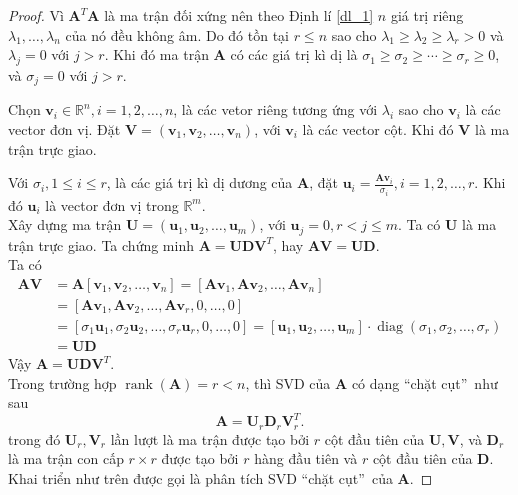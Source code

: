 \documentclass[12pt,a4paper,oneside]{report}
\numberwithin{equation}{section}
\begin{document}
\begin{proof}
Vì $\mathbf{A}^{T} \mathbf{A}$ là ma trận đối xứng nên theo Định lí \ref{dl_1} $n$ giá trị riêng $\lambda_{1}, \ldots, \lambda_{n}$ của nó đều không âm. Do đó tồn tại $r \leqslant n$ sao cho $\lambda_{1} \geqslant \lambda_{2} \geqslant \lambda_{r}>0$ và $\lambda_{j}=0$ với $j>r$. Khi đó ma trận $\mathbf{A}$ có các giá trị kì dị là $\sigma_{1} \geqslant \sigma_{2} \geqslant \cdots \geqslant \sigma_{r} \geqslant 0$, và $\sigma_{j}=0$ với $j>r$.

Chọn $\mathbf{v}_{i} \in \mathbb{R}^{n}, i=1,2, \ldots, n$, là các vetor riêng tương ứng với $\lambda_{i}$ sao cho $\mathbf{v}_{i}$ là các vector đơn vị. Đặt $\mathbf{V}=\left(\mathbf{v}_{1}, \mathbf{v}_{2}, \ldots, \mathbf{v}_{n}\right)$, với $\mathbf{v}_{i}$ là các vector cột. Khi đó $\mathbf{V}$ là ma trận trực giao.

Với $\sigma_{i}, 1 \leqslant i \leqslant r$, là các giá trị kì dị dương của $\mathbf{A}$, đặt $\mathbf{u}_{i}=\frac{\mathbf{A v}_{i}}{\sigma_{i}}, i=1,2, \ldots, r$. Khi đó $\mathbf{u}_{i}$ là vector đơn vị trong $\mathbb{R}^{m}$.\\
Xây dựng ma trận $\mathbf{U}=\left(\mathbf{u}_{1}, \mathbf{u}_{2}, \ldots, \mathbf{u}_{m}\right)$, với $\mathbf{u}_{j}=0, r<j \leqslant m$. Ta có $\mathbf{U}$ là ma trận trực giao.
Ta chứng minh $\mathbf{A}=\mathbf{U D V}^{T}$, hay $\mathbf{A V}=\mathbf{U D}$.\\
Ta có
$$
\begin{aligned}
	\mathbf{A} \mathbf{V} & =\mathbf{A}\left[\mathbf{v}_{1}, \mathbf{v}_{2}, \ldots, \mathbf{v}_{n}\right]=\left[\mathbf{A v}_{1}, \mathbf{A v}_{2}, \ldots, \mathbf{A} \mathbf{v}_{n}\right]\\
	&=\left[\mathbf{A v}_{1}, \mathbf{A v}_{2}, \ldots, \mathbf{A v}_{r}, 0, \ldots, 0\right] \\
	& =\left[\sigma_{1} \mathbf{u}_{1}, \sigma_{2} \mathbf{u}_{2}, \ldots, \sigma_{r} \mathbf{u}_{r}, 0, \ldots, 0\right]=\left[\mathbf{u}_{1}, \mathbf{u}_{2}, \ldots, \mathbf{u}_{m}\right] \cdot \operatorname{diag}\left(\sigma_{1}, \sigma_{2}, \ldots, \sigma_{r}\right) \\
	& =\mathbf{U D}
\end{aligned}
$$
Vậy $\mathbf{A}=\mathbf{U D V}^{T}$.\\%

Trong trường hợp $\operatorname{rank}(\mathbf{A})=r<n$, thì SVD của $\mathbf{A}$ có dạng \textquotedblleft chặt cụt\textquotedblright\  như sau
$$
\mathbf{A}=\mathbf{U}_r \mathbf{D}_r \mathbf{V}_r^T.
$$
trong đó $\mathbf{U}_r, \mathbf{V}_r$ lần lượt là ma trận được tạo bởi $r$ cột đầu tiên của $\mathbf{U}, \mathbf{V}$, và $\mathbf{D}_r$ là ma trận con cấp $r \times r$ được tạo bởi $r$ hàng đầu tiên và $r$ cột đầu tiên của $\mathbf{D}$. Khai triển
như trên được gọi là phân tích SVD \textquotedblleft chặt cụt\textquotedblright\  của $\mathbf{A}$.
\end{proof}
\end{document}
